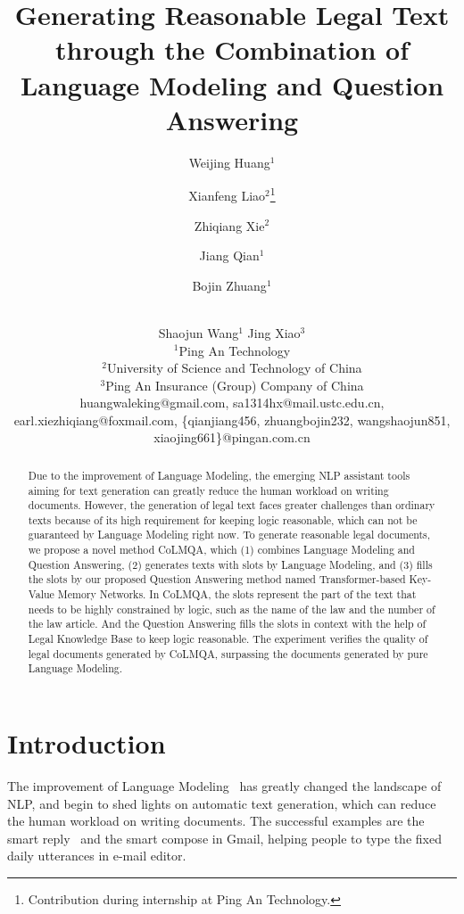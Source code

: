 \documentclass{article}
\title{Generating Reasonable Legal Text through the Combination of Language Modeling and Question Answering}
\author{
Weijing Huang$^1$\and
Xianfeng Liao$^2$\thanks{Contribution during internship at Ping An Technology.}\and
Zhiqiang Xie$^2$\footnotemark[1]\and
Jiang Qian$^1$\and
Bojin Zhuang$^1$\and \\
Shaojun Wang$^1$ \And
Jing Xiao$^3$\\
\affiliations
$^1$Ping An Technology\\
$^2$University of Science and Technology of China\\
$^3$Ping An Insurance (Group) Company of China\\
\emails
huangwaleking@gmail.com,
sa1314hx@mail.ustc.edu.cn, earl.xiezhiqiang@foxmail.com, 
\{qianjiang456, zhuangbojin232, wangshaojun851, xiaojing661\}@pingan.com.cn
}
\begin{document}
\maketitle

\begin{abstract}
Due to the improvement of Language Modeling, the emerging NLP assistant tools aiming for text generation can greatly reduce the human workload on writing documents. 
However, the generation of legal text faces greater challenges than ordinary texts because of its high requirement for keeping logic reasonable, which can not be guaranteed by  Language Modeling right now.
To generate reasonable legal documents, we propose a novel method CoLMQA, which (1) combines Language Modeling and Question Answering, (2) generates texts with slots by Language Modeling, and (3) fills the slots by our proposed Question Answering method named Transformer-based Key-Value Memory Networks. 
In CoLMQA, the slots represent the part of the text that needs to be highly constrained by logic, such as the name of the law and the number of the law article. 
And the Question Answering fills the slots in context with the help of Legal Knowledge Base to keep logic reasonable. 
The experiment verifies the quality of legal documents generated by CoLMQA, surpassing the documents generated by pure Language Modeling.
\end{abstract}

\section{Introduction}
The improvement of Language Modeling~\cite{mikolov2010recurrent,vaswani2017attention,radford2018improving,devlin2019bert} has greatly changed the landscape of NLP, and begin to shed lights on automatic text generation, which can reduce the human workload on writing documents. 
The successful examples are the smart reply~\cite{kannan2016smart} and the smart compose in Gmail, helping people to type the fixed daily utterances in e-mail editor. 
\end{document}
